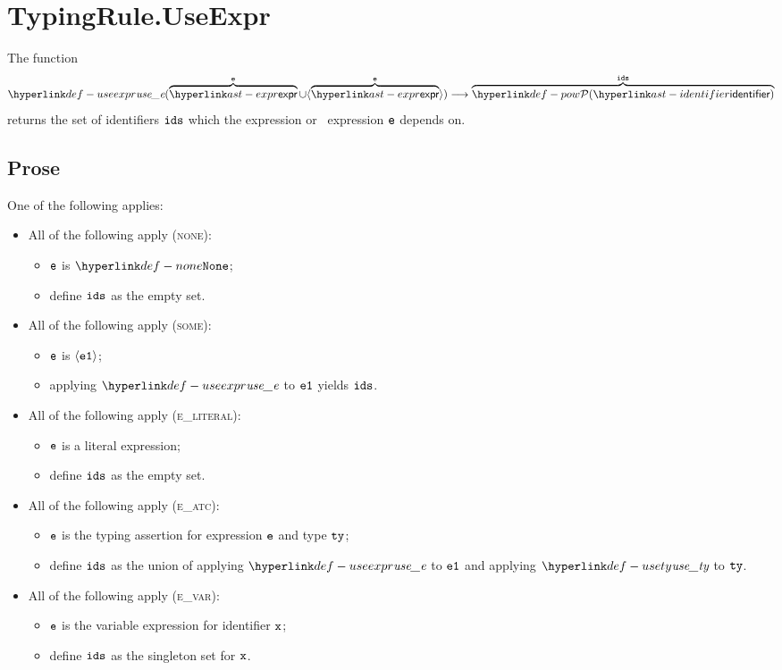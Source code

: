 \section{TypingRule.UseExpr \label{sec:TypingRule.UseExpr}}
\hypertarget{def-useexpr}{}
The function
\[
\useexpr(\overname{\expr}{\ve} \cup \langle\overname{\expr}{\ve}\rangle) \aslto \overname{\pow{\identifier}}{\ids}
\]
returns the set of identifiers $\texttt{ids}$ which the expression or \optional\ expression $\texttt{e}$ depends on.

\subsection{Prose}
One of the following applies:
\begin{itemize}
  \item All of the following apply (\textsc{none}):
  \begin{itemize}
    \item $\texttt{e}$ is $\None$;
    \item define $\texttt{ids}$ as the empty set.
  \end{itemize}

  \item All of the following apply (\textsc{some}):
  \begin{itemize}
    \item $\texttt{e}$ is $\langle\texttt{e1}\rangle$;
    \item applying $\useexpr$ to $\texttt{e1}$ yields $\texttt{ids}$.
  \end{itemize}

  \item All of the following apply (\textsc{e\_literal}):
  \begin{itemize}
    \item $\texttt{e}$ is a literal expression;
    \item define $\texttt{ids}$ as the empty set.
  \end{itemize}

  \item All of the following apply (\textsc{e\_atc}):
  \begin{itemize}
    \item $\texttt{e}$ is the typing assertion for expression $\texttt{e}$ and type $\texttt{ty}$;
    \item define $\texttt{ids}$ as the union of applying $\useexpr$ to $\texttt{e1}$ and applying $\usety$ to $\texttt{ty}$.
  \end{itemize}

  \item All of the following apply (\textsc{e\_var}):
  \begin{itemize}
    \item $\texttt{e}$ is the variable expression for identifier $\texttt{x}$;
    \item define $\texttt{ids}$ as the singleton set for $\texttt{x}$.
  \end{itemize}


\end{itemize}
